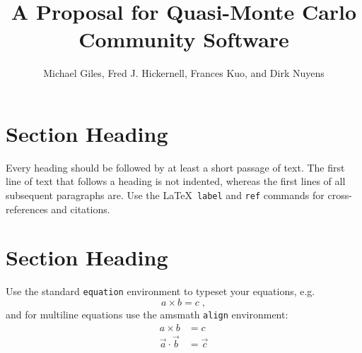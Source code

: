 \documentclass[graybox]{svmult}
\begin{document}
\title*{A Proposal for Quasi-Monte Carlo Community Software}
\author{Michael Giles, Fred J. Hickernell, Frances Kuo, and Dirk Nuyens}
%
%
\maketitle


\section{Section Heading}
\label{sec:1}
Every heading should be followed by at least a short passage of text. The first line of text that follows a heading is not indented, whereas the first lines of all subsequent paragraphs are. Use the \LaTeX\ \verb!label! and \verb!ref! commands for cross-references and citations. 

\section{Section Heading}
\label{sec:2}

Use the standard \verb|equation| environment to typeset your equations, e.g.
%
\begin{equation}
a \times b = c\;,
\end{equation}
%
and for multiline equations use the amsmath \verb|align| environment:
\begin{align}
a \times b & = c \nonumber\\
\vec{a} \cdot \vec{b} & =\vec{c}
\label{eq:01}
\end{align}
\end{document}
